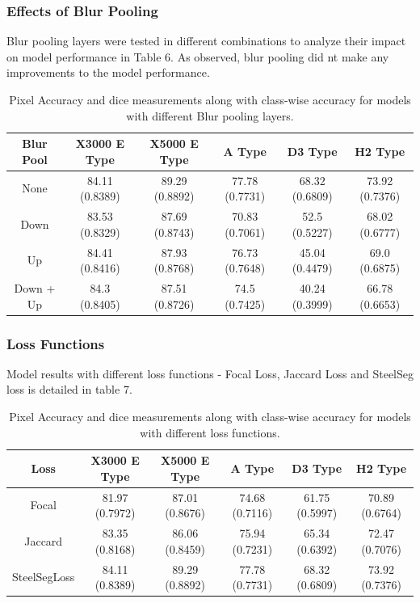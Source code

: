 \documentclass[]{article}
\begin{document}
\subsubsection{Effects of Blur Pooling}
Blur pooling layers were tested in different combinations to analyze their impact on model performance in Table 6. As observed, blur pooling did nt make any improvements to the model performance.

\begin{table}[h!]
	\centering
	\begin{tabular}{|c|c|c|c|c|c|}
		\hline
		Blur Pool & X3000 E Type & X5000 E Type & A Type & D3 Type & H2 Type \\
		\hline
		\rowcolor{yellow!30} None & 84.11 (0.8389) & 89.29 (0.8892) & 77.78 (0.7731) & 68.32 (0.6809) & 73.92 (0.7376) \\
		Down & 83.53 (0.8329) & 87.69 (0.8743) & 70.83 (0.7061) & 52.5 (0.5227) & 68.02 (0.6777) \\
		Up & 84.41 (0.8416) & 87.93 (0.8768) & 76.73 (0.7648) & 45.04 (0.4479) & 69.0 (0.6875) \\
		Down + Up & 84.3 (0.8405) & 87.51 (0.8726) & 74.5 (0.7425) & 40.24 (0.3999) & 66.78 (0.6653) \\
		\hline
	\end{tabular}
	\caption{Pixel Accuracy and dice measurements along with class-wise accuracy for models with different Blur pooling layers.}
\end{table}

\subsubsection{Loss Functions}
Model results with different loss functions - Focal Loss, Jaccard Loss and SteelSeg loss is detailed in table 7. 

\begin{table}[h!]
	\centering
	\begin{tabular}{|c|c|c|c|c|c|}
		\hline
		Loss & X3000 E Type & X5000 E Type & A Type & D3 Type & H2 Type \\
		\hline
		Focal & 81.97 (0.7972) & 87.01 (0.8676) & 74.68 (0.7116) & 61.75 (0.5997) & 70.89 (0.6764) \\
		Jaccard & 83.35 (0.8168) & 86.06 (0.8459) & 75.94 (0.7231) & 65.34 (0.6392) & 72.47 (0.7076) \\
		\rowcolor{yellow!30} SteelSegLoss & 84.11 (0.8389) & 89.29 (0.8892) & 77.78 (0.7731) & 68.32 (0.6809) & 73.92 (0.7376) \\
		\hline
	\end{tabular}
	\caption{Pixel Accuracy and dice measurements along with class-wise accuracy for models with different loss functions.}
\end{table}
\end{document}
